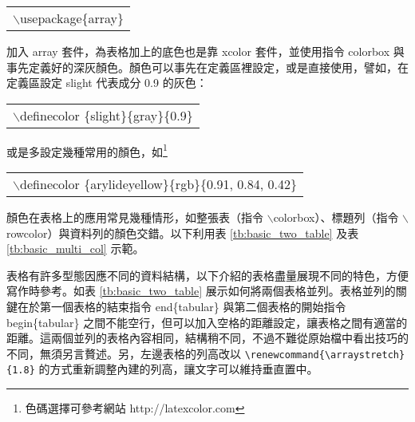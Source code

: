 \documentclass[12pt, a4paper]{article}
\begin{document}
\begin{center}\colorbox{slight}{\begin{tabular}{p{}}
	{\A $\backslash$usepackage\{array\}}
\end{tabular}}\end{center}
\bigskip
加入 {\A array} 套件，為表格加上的底色也是靠 {\A xcolor} 套件，並使用指令 {\A colorbox} 與事先定義好的深灰顏色。顏色可以事先在定義區裡設定，或是直接使用，譬如，在定義區設定 slight 代表成分 0.9 的灰色：

\begin{center}\colorbox{slight}{\begin{tabular}{p{}}
	 {\A $\backslash$definecolor \{slight\}\{gray\}\{0.9\}	}
\end{tabular}}\end{center}
\bigskip
或是多設定幾種常用的顏色，如\footnote{色碼選擇可參考網站 http://latexcolor.com}

\begin{center}\colorbox{arylideyellow}{\begin{tabular}{p{}}
	 {\A $\backslash$definecolor \{arylideyellow\}\{rgb\}\{0.91, 0.84, 0.42\}	}
\end{tabular}}\end{center}
\bigskip

顏色在表格上的應用常見幾種情形，如整張表（指令 $\backslash$colorbox）、標題列（指令 $\backslash$rowcolor）與資料列的顏色交錯。以下利用表 \ref{tb:basic_two_table} 及表 \ref{tb:basic_multi_col} 示範。

表格有許多型態因應不同的資料結構，以下介紹的表格盡量展現不同的特色，方便寫作時參考。如表 \ref{tb:basic_two_table} 展示如何將兩個表格並列。表格並列的關鍵在於第一個表格的結束指令 {\A end\{tabular\}} 與第二個表格的開始指令 {\A begin\{tabular\}} 之間不能空行，但可以加入空格的距離設定，讓表格之間有適當的距離。這兩個並列的表格內容相同，結構稍不同，不過不難從原始檔中看出技巧的不同，無須另言贅述。另，左邊表格的列高改以 \verb+\renewcommand{\arraystretch}{1.8}+ 的方式重新調整內建的列高，讓文字可以維持垂直置中。
\end{document}
